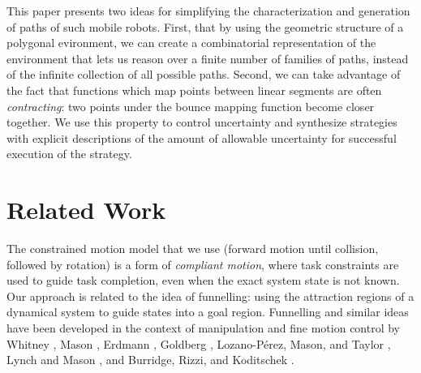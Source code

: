 \documentclass[]{styles/svproc}  %
\begin{document}
This paper presents two ideas for simplifying the characterization and
generation of paths of such mobile robots.  First, that by using the geometric
structure of a polygonal evironment, we can create a combinatorial
representation of the environment that lets us reason over a finite number of
families of paths, instead of the infinite collection of all possible paths.
Second, we can take advantage of the fact that functions which map points
between linear segments are often \emph{contracting}: two points under the
bounce mapping function become closer together.  We use this property to
control uncertainty and synthesize strategies with explicit descriptions of the
amount of allowable uncertainty for successful execution of the strategy.





\section{Related Work}

The constrained motion model that we use (forward motion until collision,
followed by rotation) is a
form of \emph{compliant motion}, where task constraints are used to guide task
completion, even when the exact system state is not known. Our approach is
related to the idea of funnelling: using
the attraction regions of a dynamical system to guide states into a goal region.
Funnelling and similar ideas have been developed in the context of manipulation and fine motion control by Whitney
\cite{Whi77}, Mason \cite{Mas85}, Erdmann
\cite{Erd86}, Goldberg \cite{Gol93}, Lozano-P{\'e}rez, Mason, and Taylor
\cite{LozMasTay84}, Lynch and Mason \cite{LynMas95}, and Burridge, Rizzi, and Koditschek \cite{BurRizKod99}.
\end{document}

